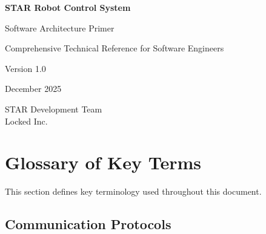 \documentclass[11pt,letterpaper]{article}
\begin{document}
\begin{titlepage}
    \centering
    \vspace*{2cm}

    {\Huge\bfseries STAR Robot Control System\par}
    \vspace{0.5cm}
    {\LARGE Software Architecture Primer\par}
    \vspace{1cm}
    {\Large Comprehensive Technical Reference for Software Engineers\par}

    \vfill

    {\large Version 1.0\par}
    {\large December 2025\par}

    \vfill

    {\normalsize STAR Development Team\\
    Locked Inc.\par}
\end{titlepage}

\tableofcontents
\newpage

\section{Glossary of Key Terms}

This section defines key terminology used throughout this document.

\subsection{Communication Protocols}
\end{document}
